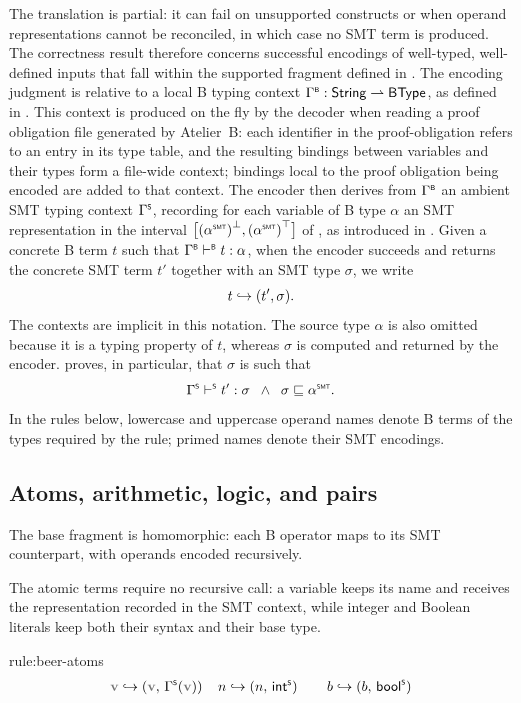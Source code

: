 The translation is partial: it can fail on unsupported constructs or when operand representations cannot be reconciled, in which case no SMT term is produced. The correctness result therefore concerns successful encodings of well-typed, well-defined inputs that fall within the supported fragment defined in .
The encoding judgment is relative to a local B typing context
\(\Gamma^{\scriptscriptstyle{\mathsf{B}}} : \mathsf{String} \rightharpoonup \mathsf{BType}\), as defined in .
This context is produced on the fly by the decoder when reading a proof obligation file generated by Atelier~B: each identifier in the proof-obligation refers to an entry in its type table, and the resulting bindings between variables and their types form a file-wide context; bindings local to the proof obligation being encoded are added to that context.
The encoder then derives from \(\Gamma^{\scriptscriptstyle{\mathsf{B}}}\) an ambient SMT typing context \(\Gamma^{\scriptscriptstyle{\mathsf{S}}}\), recording for each variable of B type \(\alpha\) an SMT representation in the interval
\(\bigl[\lgf{(\toSMT{\alpha})},\mgf{(\toSMT{\alpha})}\bigr]\) of , as introduced in .
Given a concrete B term \(t\) such that \(\Gamma^{\scriptscriptstyle{\mathsf{B}}} \vdash^{\scriptscriptstyle{\mathsf{B}}} t : \alpha\), when the encoder succeeds and returns the concrete SMT term \(t'\) together with an SMT type \(\sigma\), we write
\[
  t \mathrel{\hookrightarrow} (t', \sigma).
\]
The contexts are implicit in this notation.
The source type \(\alpha\) is also omitted because it is a typing property of \(t\), whereas \(\sigma\) is computed and returned by the encoder.  proves, in particular, that \(\sigma\) is such that
\[
  \stype{\sop{\Gamma}}{t'}{\sigma} \;\;\land\;\; \castable{\sigma}{\toSMT{\alpha}}.
\]
In the rules below, lowercase and uppercase operand names denote B terms of the types required by the rule; primed names denote their SMT encodings.

\subsection{Atoms, arithmetic, logic, and pairs}
\label{sec:beer-rules-homomorphic}

The base fragment is homomorphic: each B operator maps to its SMT counterpart, with operands encoded recursively.

The atomic terms require no recursive call: a variable keeps its name and receives the representation recorded in the SMT context, while integer and Boolean literals keep both their syntax and their base type.
\begin{encrule}[atoms]{rule:beer-atoms}
\[
\begin{aligned}
  \var{v} \encto (\var{v},\, \sop{\Gamma}(\var{v}))\mkern20mu
  & n \encto (n,\, \intS)\mkern20mu
  & b \encto (b,\, \boolS)
\end{aligned}
\]
\end{encrule}

